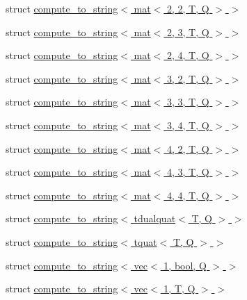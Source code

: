 \begin{DoxyCompactItemize}
struct \hyperlink{structglm_1_1detail_1_1compute__to__string_3_01mat_3_012_00_012_00_01_t_00_01_q_01_4_01_4}{compute\+\_\+to\+\_\+string$<$ mat$<$ 2, 2, T, Q $>$ $>$}
\item 
struct \hyperlink{structglm_1_1detail_1_1compute__to__string_3_01mat_3_012_00_013_00_01_t_00_01_q_01_4_01_4}{compute\+\_\+to\+\_\+string$<$ mat$<$ 2, 3, T, Q $>$ $>$}
\item 
struct \hyperlink{structglm_1_1detail_1_1compute__to__string_3_01mat_3_012_00_014_00_01_t_00_01_q_01_4_01_4}{compute\+\_\+to\+\_\+string$<$ mat$<$ 2, 4, T, Q $>$ $>$}
\item 
struct \hyperlink{structglm_1_1detail_1_1compute__to__string_3_01mat_3_013_00_012_00_01_t_00_01_q_01_4_01_4}{compute\+\_\+to\+\_\+string$<$ mat$<$ 3, 2, T, Q $>$ $>$}
\item 
struct \hyperlink{structglm_1_1detail_1_1compute__to__string_3_01mat_3_013_00_013_00_01_t_00_01_q_01_4_01_4}{compute\+\_\+to\+\_\+string$<$ mat$<$ 3, 3, T, Q $>$ $>$}
\item 
struct \hyperlink{structglm_1_1detail_1_1compute__to__string_3_01mat_3_013_00_014_00_01_t_00_01_q_01_4_01_4}{compute\+\_\+to\+\_\+string$<$ mat$<$ 3, 4, T, Q $>$ $>$}
\item 
struct \hyperlink{structglm_1_1detail_1_1compute__to__string_3_01mat_3_014_00_012_00_01_t_00_01_q_01_4_01_4}{compute\+\_\+to\+\_\+string$<$ mat$<$ 4, 2, T, Q $>$ $>$}
\item 
struct \hyperlink{structglm_1_1detail_1_1compute__to__string_3_01mat_3_014_00_013_00_01_t_00_01_q_01_4_01_4}{compute\+\_\+to\+\_\+string$<$ mat$<$ 4, 3, T, Q $>$ $>$}
\item 
struct \hyperlink{structglm_1_1detail_1_1compute__to__string_3_01mat_3_014_00_014_00_01_t_00_01_q_01_4_01_4}{compute\+\_\+to\+\_\+string$<$ mat$<$ 4, 4, T, Q $>$ $>$}
\item 
struct \hyperlink{structglm_1_1detail_1_1compute__to__string_3_01tdualquat_3_01_t_00_01_q_01_4_01_4}{compute\+\_\+to\+\_\+string$<$ tdualquat$<$ T, Q $>$ $>$}
\item 
struct \hyperlink{structglm_1_1detail_1_1compute__to__string_3_01tquat_3_01_t_00_01_q_01_4_01_4}{compute\+\_\+to\+\_\+string$<$ tquat$<$ T, Q $>$ $>$}
\item 
struct \hyperlink{structglm_1_1detail_1_1compute__to__string_3_01vec_3_011_00_01bool_00_01_q_01_4_01_4}{compute\+\_\+to\+\_\+string$<$ vec$<$ 1, bool, Q $>$ $>$}
\item 
struct \hyperlink{structglm_1_1detail_1_1compute__to__string_3_01vec_3_011_00_01_t_00_01_q_01_4_01_4}{compute\+\_\+to\+\_\+string$<$ vec$<$ 1, T, Q $>$ $>$}

\end{DoxyCompactItemize}
